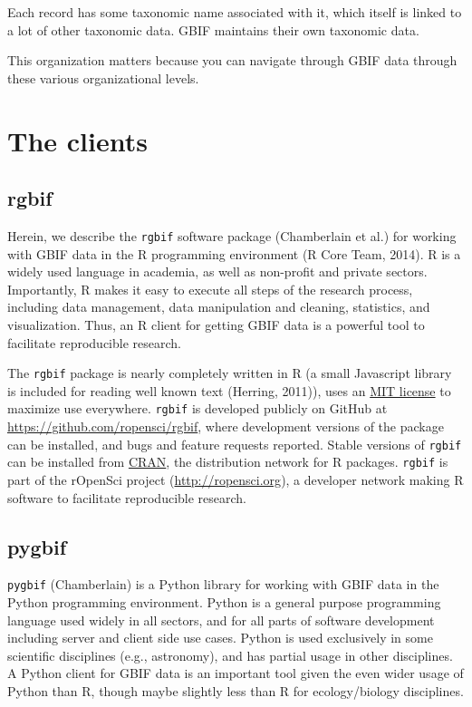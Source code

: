 \documentclass[author-year, review, 11pt]{components/elsarticle} %
\begin{document}
Each record has some taxonomic name associated with it, which itself is
linked to a lot of other taxonomic data. GBIF maintains their own
taxonomic data.

This organization matters because you can navigate through GBIF data
through these various organizational levels.

\section{The clients}\label{the-clients}

\subsection{rgbif}\label{rgbif}

Herein, we describe the \texttt{rgbif} software package (Chamberlain et
al.) for working with GBIF data in the R programming environment (R Core
Team, 2014). R is a widely used language in academia, as well as
non-profit and private sectors. Importantly, R makes it easy to execute
all steps of the research process, including data management, data
manipulation and cleaning, statistics, and visualization. Thus, an R
client for getting GBIF data is a powerful tool to facilitate
reproducible research.

The \texttt{rgbif} package is nearly completely written in R (a small
Javascript library is included for reading well known text (Herring,
2011)), uses an \href{http://choosealicense.com/licenses/mit/}{MIT
license} to maximize use everywhere. \texttt{rgbif} is developed
publicly on GitHub at
\href{https://github.com/ropensci/rgbif}{\url{https://github.com/ropensci/rgbif}},
where development versions of the package can be installed, and bugs and
feature requests reported. Stable versions of \texttt{rgbif} can be
installed from
\href{https://cran.rstudio.com/web/packages/rgbif/}{CRAN}, the
distribution network for R packages. \texttt{rgbif} is part of the
rOpenSci project (\url{http://ropensci.org}), a developer network making
R software to facilitate reproducible research.

\subsection{pygbif}\label{pygbif}

\texttt{pygbif} (Chamberlain) is a Python library for working with GBIF
data in the Python programming environment. Python is a general purpose
programming language used widely in all sectors, and for all parts of
software development including server and client side use cases. Python
is used exclusively in some scientific disciplines (e.g., astronomy),
and has partial usage in other disciplines. A Python client for GBIF
data is an important tool given the even wider usage of Python than R,
though maybe slightly less than R for ecology/biology disciplines.
\end{document}
